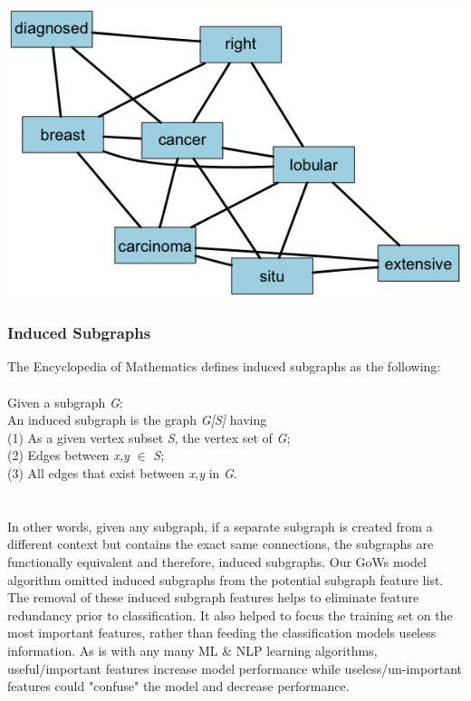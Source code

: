 \documentclass[twoside,twocolumn]{article}
\newenvironment{Figure}
  {\par\medskip\noindent\minipage{\linewidth}}
  {\endminipage\par\medskip}
\begin{document}
\begin{Figure}
 \centering
 \label{fig:subgraph}
 \includegraphics[width=\linewidth]{Rgraphviz_Subgraph.png}
\end{Figure}

\subsubsection{Induced Subgraphs}
The Encyclopedia of Mathematics defines induced subgraphs as the following:\\
\\
Given a subgraph \textit{G}:\\
An induced subgraph is the graph \textit{G[S]} having \\
(1) As a given vertex subset \textit{S}, the vertex set of \textit{G};\\
(2) Edges between \textit{x,y} $\in$ \textit{S};\\
(3) All edges that exist between \textit{x,y} in \textit{G}.\\
\cite{mathematics_2016}\\
\\
In other words, given any subgraph, if a separate subgraph is created from a different context but contains the exact same connections, the subgraphs are functionally equivalent and therefore, induced subgraphs. Our GoWs model algorithm omitted induced subgraphs from the potential subgraph feature list. The removal of these induced subgraph features helps to eliminate feature redundancy prior to classification. It also helped to focus the training set on the most important features, rather than feeding the classification models useless information. As is with any many ML \& NLP learning algorithms, useful/important features increase model performance while useless/un-important features could "confuse" the model and decrease performance.
\end{document}
